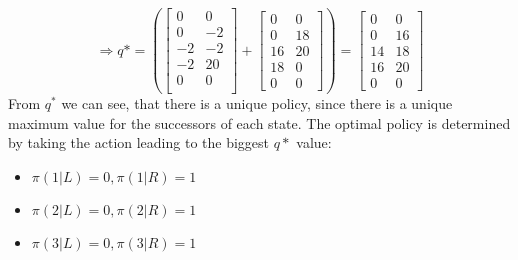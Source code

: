 \begin{equation}
    \Rightarrow q*=\left(
        \begin{bmatrix}
            0 & 0 \\
            0 & -2\\
            -2 & -2\\
            -2 & 20\\
            0 & 0\\
        \end{bmatrix}+
        \begin{bmatrix}
            0 & 0\\
            0 & 18\\
            16 & 20\\
            18 & 0\\
            0 & 0
        \end{bmatrix}
        \right)=
        \begin{bmatrix}
            0 & 0\\
            0 & 16\\
            14 & 18\\
            16 & 20\\
            0 & 0
        \end{bmatrix}
\end{equation}
From $q^*$ we can see, that there is a unique policy, since there is a unique
maximum value for the successors of each state. The optimal policy is determined by
taking the action leading to the biggest $q*$ value:
\begin{itemize}
    \item $\pi(1|L)=0, \pi(1|R)=1$
    \item $\pi(2|L)=0, \pi(2|R)=1$
    \item $\pi(3|L)=0, \pi(3|R)=1$
\end{itemize}

